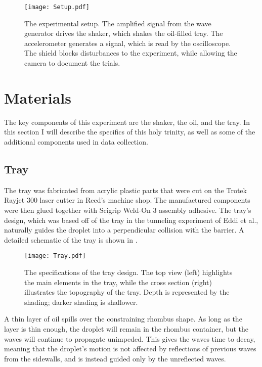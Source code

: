    
    
\begin{figure}[h!]
	\centering
	\texttt{[image: Setup.pdf]}
	\caption{The experimental setup. The amplified signal from the wave generator drives the shaker, which shakes the oil-filled tray. The accelerometer generates a signal, which is read by the oscilloscope. The shield blocks disturbances to the experiment, while allowing the camera to document the trials.}
	\label{setup}
\end{figure}

\section{Materials}
The key components of this experiment are the shaker, the oil, and the tray. In this section I will describe the specifics of this holy trinity, as well as some of the additional components used in data collection. 

\subsection{Tray}
The tray was fabricated from acrylic plastic parts that were cut on the Trotek Rayjet 300 laser cutter in Reed's machine shop. The manufactured components were then glued together with Scigrip Weld-On 3 assembly adhesive. The tray's design, which was based off of the tray in the tunneling experiment of Eddi et al., naturally guides the droplet into a perpendicular collision with the barrier. A detailed schematic of the tray is shown in . 

\begin{figure}[h!]
	\centering
	\texttt{[image: Tray.pdf]}
	\caption{The specifications of the tray design. The top view (left) highlights the main elements in the tray, while the cross section (right) illustrates the topography of the tray. Depth is represented by the shading; darker shading is shallower.}
	\label{tray}
\end{figure}

A thin layer of oil spills over the constraining rhombus shape. As long as the layer is thin enough, the droplet will remain in the rhombus container, but the waves will continue to propagate unimpeded. This gives the waves time to decay, meaning that the droplet's motion is not affected by reflections of previous waves from the sidewalls, and is instead guided only by the unreflected waves. 

